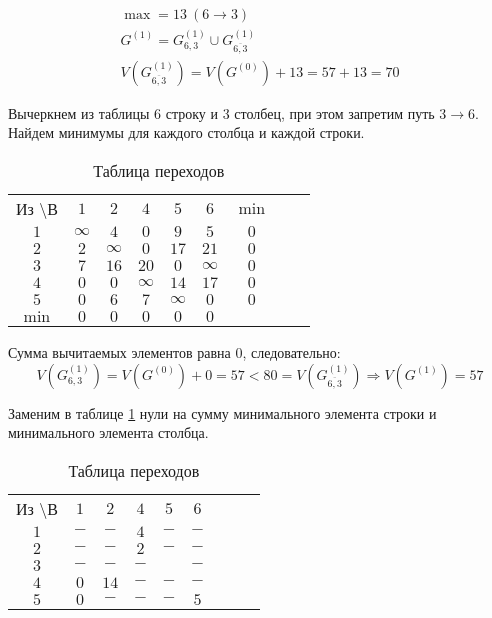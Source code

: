 \begin{gather*}
\max = 13\ (6 \rightarrow 3) \\
G^{(1)} = G_{6,3}^{(1)} \cup G_{\overline{6,3}}^{(1)} \\
V(G_{\overline{6,3}}^{(1)}) = V(G^{(0)}) + 13 = 57 + 13 = 70
\end{gather*}

Вычеркнем из таблицы $6$ строку и $3$ столбец, при этом запретим путь $3 \rightarrow 6$. Найдем минимумы для каждого столбца и каждой строки.

\begin{table}[H]
\begin{center}
	\def\tabcolsep{15pt}
	\caption{Таблица переходов}
	\label{tab:10}
	\begin{tabular}{|c||c|c|c|c|c|c|c|c|}
		\hline
		Из \textbackslash В & $1$ & $2$ & $4$ & $5$ & $6$ & $\min$ \\
		\hhline{|=#=|=|=|=|=|=|}
		$1$ & $\infty$ & $4$ & $0$ & $9$ & $5$ & $0$ \\
		\hline
		$2$ & $2$ & $\infty$ & $0$ & $17$ & $21$ & $0$ \\
		\hline
		$3$ & $7$ & $16$ & $20$ & $0$ & $\infty$ & $0$ \\ 
		\hline
		$4$ & $0$ & $0$ & $\infty$ & $14$ & $17$ & $0$ \\
		\hline
		$5$ & $0$ & $6$ & $7$ & $\infty$ & $0$ & $0$ \\
		\hhline{|=#=|=|=|=|=|=|} 
		$\min$ & $0$ & $0$ & $0$ & $0$ & $0$ & \\ 
		\hline
	\end{tabular}
\end{center}
\end{table}

Сумма вычитаемых элементов равна $0$, следовательно:
\begin{equation*}
V(G_{6,3}^{(1)}) = V(G^{(0)}) + 0 = 57 < 80 = V(G_{\overline{6,3}}^{(1)}) \Rightarrow V(G^{(1)}) = 57
\end{equation*}

Заменим в таблице \ref{tab:10} нули на сумму минимального элемента строки и минимального элемента столбца.

\begin{table}[H]
\begin{center}
	\def\tabcolsep{15pt}
	\caption{Таблица переходов}
	\label{tab:11}
	\begin{tabular}{|c||c|c|c|c|c|c|c|c|}
		\hline
		Из \textbackslash В & $1$ & $2$ & $4$ & $5$ & $6$ \\
		\hhline{|=#=|=|=|=|=|=|}
		$1$ & $-$ & $-$ & $4$ & $-$ & $-$ \\
		\hline
		$2$ & $-$ & $-$ & $2$ & $-$ & $-$ \\
		\hline
		$3$ & $-$ & $-$ & $-$ & \redbold{$16$} & $-$ \\ 
		\hline
		$4$ & $0$ & $14$ & $-$ & $-$ & $-$ \\
		\hline
		$5$ & $0$ & $-$ & $-$ & $-$ & $5$ \\
		\hline
	\end{tabular}
\end{center}
\end{table}

